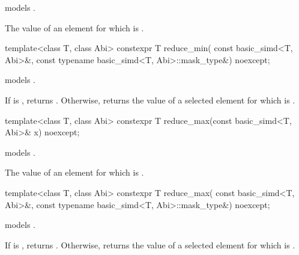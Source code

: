 \begin{itemdescr}
  \pnum\constraints
   models .

  \pnum\returns
  The value of an element  for which  is 
  \foralli.
\end{itemdescr}

\begin{itemdecl}
template<class T, class Abi>
  constexpr T reduce_min(
    const basic_simd<T, Abi>&, const typename basic_simd<T, Abi>::mask_type&) noexcept;
\end{itemdecl}

\begin{itemdescr}
  \pnum\constraints
   models .

  \pnum\returns
  If  is , returns .
  Otherwise, returns the value of a selected element  for which  is  \forallmaskedi.
\end{itemdescr}

\begin{itemdecl}
template<class T, class Abi> constexpr T reduce_max(const basic_simd<T, Abi>& x) noexcept;
\end{itemdecl}

\begin{itemdescr}
  \pnum\constraints
   models .

  \pnum\returns
  The value of an element  for which  is 
  \foralli.
\end{itemdescr}

\begin{itemdecl}
template<class T, class Abi>
  constexpr T reduce_max(
    const basic_simd<T, Abi>&, const typename basic_simd<T, Abi>::mask_type&) noexcept;
\end{itemdecl}

\begin{itemdescr}
  \pnum\constraints
   models .

  \pnum\returns
  If  is , returns .
  Otherwise, returns the value of a selected element  for which  is  \forallmaskedi.
\end{itemdescr}

